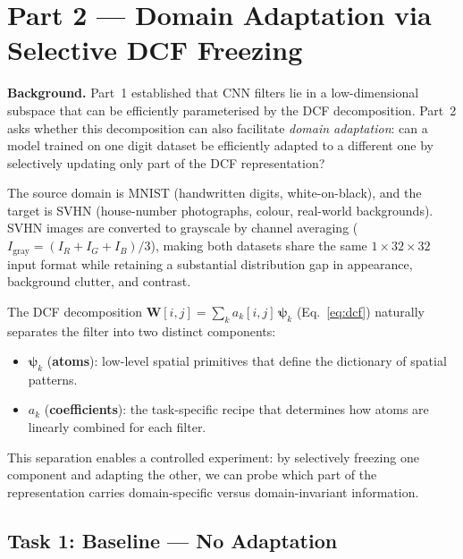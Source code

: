 \documentclass[11pt,letterpaper]{article}
\newcommand{\W}{\mathbf{W}}
\newcommand{\psivec}{\boldsymbol{\psi}}
\begin{document}
\newpage


\section{Part 2 --- Domain Adaptation via Selective DCF Freezing}
\label{sec:part2}

\noindent
\textbf{Background.}
Part~1 established that CNN filters lie in a low-dimensional subspace that
can be efficiently parameterised by the DCF decomposition.  Part~2 asks
whether this decomposition can also facilitate \emph{domain adaptation}:
can a model trained on one digit dataset be efficiently adapted to a
different one by selectively updating only part of the DCF representation?

The source domain is MNIST \cite{lecun1998gradient} (handwritten digits,
white-on-black), and the target is SVHN \cite{netzer2011reading}
(house-number photographs, colour, real-world backgrounds).  SVHN images
are converted to grayscale by channel averaging
($I_\text{gray} = (I_R+I_G+I_B)/3$), making both datasets share the same
$1{\times}32{\times}32$ input format while retaining a substantial
distribution gap in appearance, background clutter, and contrast.

The DCF decomposition $\W[i,j] = \sum_k a_k[i,j]\,\psivec_k$ (Eq.~\ref{eq:dcf})
naturally separates the filter into two distinct components:
\begin{itemize}[leftmargin=*]
  \item $\psivec_k$ (\textbf{atoms}): low-level spatial primitives that
        define the dictionary of spatial patterns.
  \item $a_k$ (\textbf{coefficients}): the task-specific recipe that
        determines how atoms are linearly combined for each filter.
\end{itemize}
This separation enables a controlled experiment: by selectively freezing
one component and adapting the other, we can probe which part of the
representation carries domain-specific versus domain-invariant information.

\subsection{Task 1: Baseline --- No Adaptation}
\label{sec:p2_task1}
\end{document}
